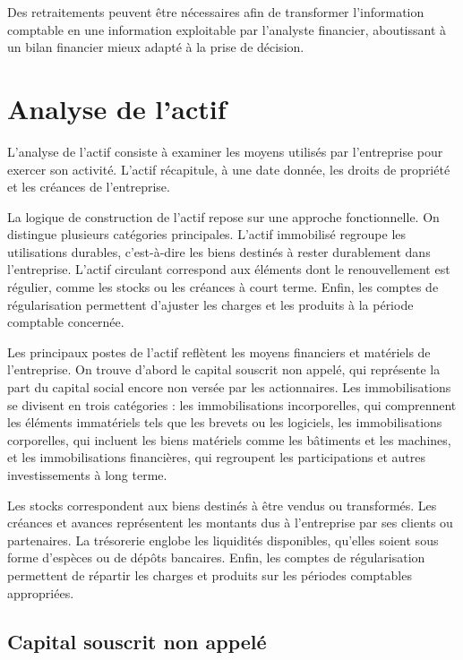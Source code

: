 \documentclass[a4paper, 12pt]{report}
\begin{document}
Des retraitements peuvent être nécessaires afin de transformer l'information comptable en une information exploitable par l'analyste financier, aboutissant à un bilan financier mieux adapté à la prise de décision.

\section{Analyse de l'actif}

L'analyse de l'actif consiste à examiner les moyens utilisés par l'entreprise pour exercer son activité. L'actif récapitule, à une date donnée, les droits de propriété et les créances de l'entreprise. 

La logique de construction de l'actif repose sur une approche fonctionnelle. On distingue plusieurs catégories principales. L'actif immobilisé regroupe les utilisations durables, c'est-à-dire les biens destinés à rester durablement dans l'entreprise. L'actif circulant correspond aux éléments dont le renouvellement est régulier, comme les stocks ou les créances à court terme. Enfin, les comptes de régularisation permettent d'ajuster les charges et les produits à la période comptable concernée.

Les principaux postes de l'actif reflètent les moyens financiers et matériels de l'entreprise. On trouve d'abord le capital souscrit non appelé, qui représente la part du capital social encore non versée par les actionnaires. Les immobilisations se divisent en trois catégories : les immobilisations incorporelles, qui comprennent les éléments immatériels tels que les brevets ou les logiciels, les immobilisations corporelles, qui incluent les biens matériels comme les bâtiments et les machines, et les immobilisations financières, qui regroupent les participations et autres investissements à long terme. 

Les stocks correspondent aux biens destinés à être vendus ou transformés. Les créances et avances représentent les montants dus à l'entreprise par ses clients ou partenaires. La trésorerie englobe les liquidités disponibles, qu'elles soient sous forme d'espèces ou de dépôts bancaires. Enfin, les comptes de régularisation permettent de répartir les charges et produits sur les périodes comptables appropriées.

\subsection{Capital souscrit non appelé}
\end{document}
